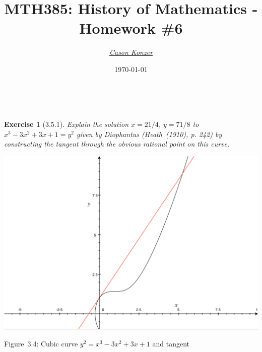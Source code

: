 \documentclass[12pt]{article}
\newcommand{\XB}{\color{black}}
\newcommand{\XBB}{\color{blue}}
\newcommand{\XV}{\color{violet}}
\theoremstyle{plain}
\newtheorem{ex}{Exercise}
\begin{document}
\title{\textbf{MTH385}: History of Mathematics - Homework \#6}
\date{\today}
\author{\XV\textit{\large{\href{https://github.com/casonk}{Cason Konzer}}}\XB}

\maketitle

\hrulefill

\newpage

\XBB\hrulefill\XB \\
\begin{ex} [3.5.1]
  Explain the solution $ x = 21 / 4 $, $ y = 71 / 8 $ to $ x^{3} - 3x^{2} + 3x + 1 = y^{2} $ given by Diophantus (Heath~(1910), p. 242) by constructing the tangent through the obvious rational point on this curve.
\end{ex}

\begin{center}
\includegraphics[scale=0.6]{cubic}

Figure~3.4: Cubic curve $y^2=x^3-3x^2+3x+1$ and tangent
\end{center}
\XBB\hrulefill\XB \\

\newpage
\end{document}
